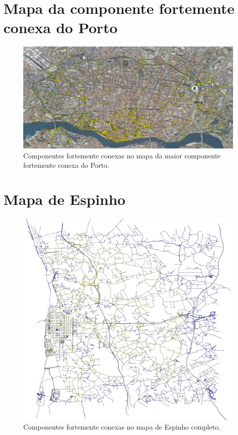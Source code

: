 \documentclass[12pt,a4paper]{report}
\begin{document}
\section{Mapa da componente fortemente conexa do Porto}

\begin{figure}[H]
	\includegraphics[width=1.0\textwidth]{./imgs/scc/portoStrongSCC.png}
	\centering
	\caption{Componentes fortemente conexas no mapa da maior componente fortemente conexa do Porto.}
\end{figure}


\section{Mapa de Espinho}

\begin{figure}[H]
	\includegraphics[width=1.0\textwidth]{./imgs/scc/espinhoSCC.png}
	\centering
	\caption{Componentes fortemente conexas no mapa de Espinho completo.}
\end{figure}
\end{document}
